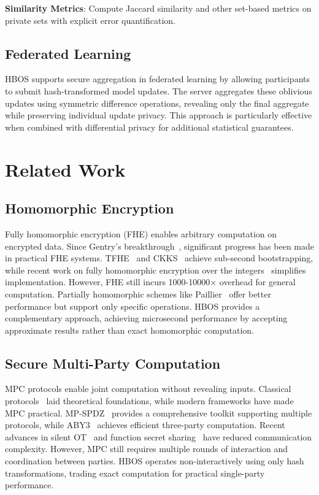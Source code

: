\documentclass[10pt,conference]{IEEEtran}
\begin{document}
\textbf{Similarity Metrics}: Compute Jaccard similarity and other set-based metrics on private sets with explicit error quantification.

\subsection{Federated Learning}

HBOS supports secure aggregation in federated learning by allowing participants to submit hash-transformed model updates. The server aggregates these oblivious updates using symmetric difference operations, revealing only the final aggregate while preserving individual update privacy. This approach is particularly effective when combined with differential privacy for additional statistical guarantees.

\section{Related Work}
\label{sec:related}

\subsection{Homomorphic Encryption}

Fully homomorphic encryption (FHE) enables arbitrary computation on encrypted data. Since Gentry's breakthrough~\cite{gentry2009fully}, significant progress has been made in practical FHE systems. TFHE~\cite{chillotti2020tfhe} and CKKS~\cite{cheon2017homomorphic} achieve sub-second bootstrapping, while recent work on fully homomorphic encryption over the integers~\cite{brakerski2022fully} simplifies implementation. However, FHE still incurs 1000-10000× overhead for general computation. Partially homomorphic schemes like Paillier~\cite{paillier1999public} offer better performance but support only specific operations. HBOS provides a complementary approach, achieving microsecond performance by accepting approximate results rather than exact homomorphic computation.

\subsection{Secure Multi-Party Computation}

MPC protocols enable joint computation without revealing inputs. Classical protocols~\cite{yao1982protocols, goldreich1987play} laid theoretical foundations, while modern frameworks have made MPC practical. MP-SPDZ~\cite{keller2020mp} provides a comprehensive toolkit supporting multiple protocols, while ABY3~\cite{mohassel2018aby3} achieves efficient three-party computation. Recent advances in silent OT~\cite{boyle2022cheaper} and function secret sharing~\cite{boyle2021function} have reduced communication complexity. However, MPC still requires multiple rounds of interaction and coordination between parties. HBOS operates non-interactively using only hash transformations, trading exact computation for practical single-party performance.
\end{document}
